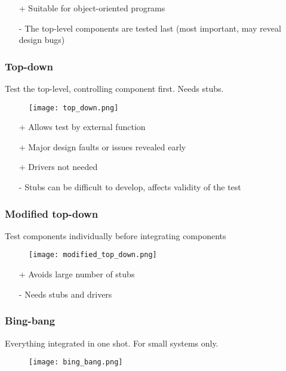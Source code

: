 \begin{itemize}
    \item[+] Suitable for object-oriented programs
    \item[-] The top-level components are tested last (most important, may reveal design bugs)
\end{itemize}

\subsubsection{Top-down}
Test the top-level, controlling component first.
Needs stubs.

\begin{figure}[!ht]
    \centering
    \texttt{[image: top\_down.png]}
\end{figure}

\begin{itemize}
    \item[+] Allows test by external function
    \item[+] Major design faults or issues revealed early
    \item[+] Drivers not needed
    \item[-] Stubs can be difficult to develop, affects validity of the test
\end{itemize}

\subsubsection{Modified top-down}
Test components individually before integrating components

\begin{figure}[!ht]
    \centering
    \texttt{[image: modified\_top\_down.png]}
\end{figure}

\begin{itemize}
    \item[+] Avoids large number of stubs
    \item[-] Needs stubs and drivers
\end{itemize}

\subsubsection{Bing-bang}
Everything integrated in one shot.
For small systems only.

\begin{figure}[!ht]
    \centering
    \texttt{[image: bing\_bang.png]}
\end{figure}

